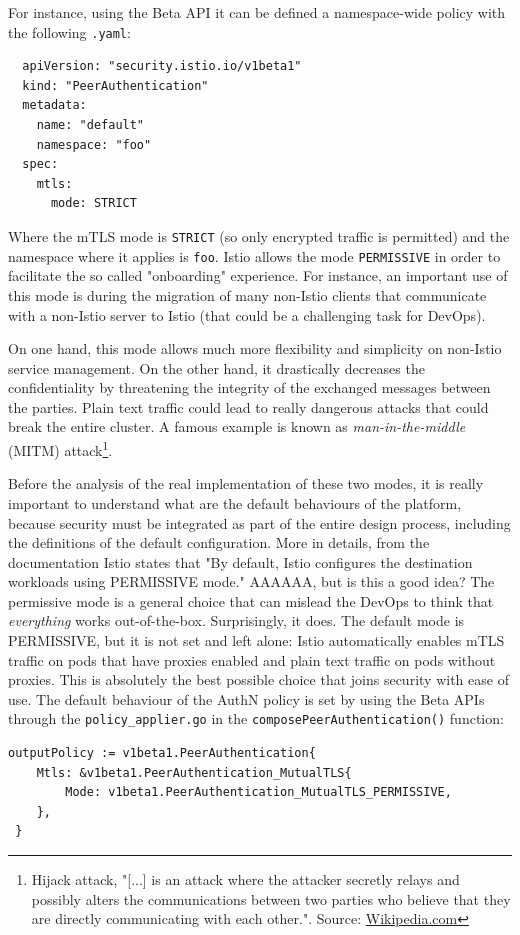 \noindent For instance, using the Beta API it can be defined a namespace-wide policy with the following \texttt{.yaml}:

\begin{lstlisting}
  apiVersion: "security.istio.io/v1beta1"
  kind: "PeerAuthentication"
  metadata:
    name: "default"
    namespace: "foo"
  spec:
    mtls:
      mode: STRICT
\end{lstlisting}

\noindent Where the mTLS mode is \texttt{STRICT} (so only encrypted traffic is permitted) and the namespace where it applies is \texttt{foo}. Istio allows the mode \texttt{PERMISSIVE} in order to facilitate the so called "onboarding" experience. For instance, an important use of this mode is during the migration of many non-Istio clients that communicate with a non-Istio server to Istio (that could be a challenging task for DevOps).

On one hand, this mode allows much more flexibility and simplicity on non-Istio service management. On the other hand, it drastically decreases the confidentiality by threatening the integrity of the exchanged messages between the parties. Plain text traffic could lead to really dangerous attacks that could break the entire cluster. A famous example is known as \textit{man-in-the-middle} (MITM) attack\footnote{Hijack attack, "[...] is an attack where the attacker secretly relays and possibly alters the communications between two parties who believe that they are directly communicating with each other.". Source: \href{https://en.wikipedia.org/wiki/Man-in-the-middle_attack}{Wikipedia.com}}.

Before the analysis of the real implementation of these two modes, it is really important to understand what are the default behaviours of the platform, because security must be integrated as part of the entire design process, including the definitions of the default configuration. More in details, from the documentation Istio states that "By default, Istio configures the destination workloads using PERMISSIVE mode." AAAAAA, but is this a good idea? The permissive mode is a general choice that can mislead the DevOps to think that \textit{everything} works out-of-the-box. Surprisingly, it does. The default mode is PERMISSIVE, but it is not set and left alone: Istio automatically enables mTLS traffic on pods that have proxies enabled and plain text traffic on pods without proxies. This is absolutely the best possible choice that joins security with ease of use. The default behaviour of the AuthN policy is set by using the Beta APIs through the \texttt{policy\_applier.go} in the \texttt{composePeerAuthentication()} function:
\vspace{0.3cm}
\begin{lstlisting}[title={\href{https://github.com/istio/istio/blob/ec8b8ba452b372b8ceaf8a5dea973bc561bf39b4/pilot/pkg/security/authn/v1beta1/policy\_applier.go\#L411}{GitHub permalink}}]
 outputPolicy := v1beta1.PeerAuthentication{
    Mtls: &v1beta1.PeerAuthentication_MutualTLS{
        Mode: v1beta1.PeerAuthentication_MutualTLS_PERMISSIVE,
    },
 }

\end{lstlisting}


